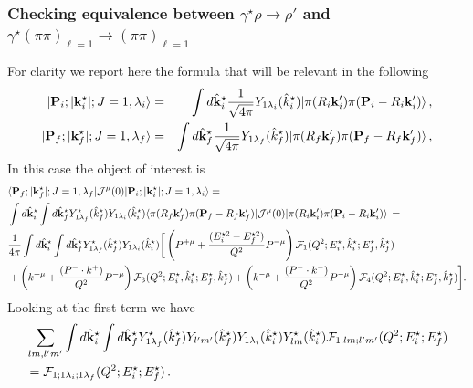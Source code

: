 {\subsubsection{Checking equivalence between $\gamma^\star\rho\to\rho'$ and $\gamma^\star(\pi\pi)_{\ell=1}\to(\pi\pi)_{\ell=1}$}
For clarity we report here the formula that will be relevant in the following
\begin{eqnarray}
|{\bf P}_i;|{\bf k}_i^\star|;J=1,\lambda_i\rangle&=&\int d\hat{\bf k}^\star_i\frac{1}{\sqrt{4\pi}}Y_{1\lambda_i}(\hat{k}_i^\star)|\pi(R_i{\bf k}_i^\prime)\pi({\bf P}_i-R_i{\bf k}_i^\prime)\rangle\, ,\\
|{\bf P}_f;|{\bf k}_f^\star|;J=1,\lambda_f\rangle&=&\int d\hat{\bf k}^\star_f\frac{1}{\sqrt{4\pi}}Y_{1\lambda_f}(\hat{k}_f^\star)|\pi(R_f{\bf k}_f^\prime)\pi({\bf P}_f-R_f{\bf k}_f^\prime)\rangle\, ,
\end{eqnarray}
In this case the object of interest is
\begin{eqnarray}
&\langle{\bf P}_f;|{\bf k}^\star_f|;J=1,\lambda_f|{\cal J}^\mu(0)|{\bf P}_i;|{\bf k}^\star_i|;J=1,\lambda_i\rangle=\\
&\int d\hat{\bf k}_i^\star\int d\hat{\bf k}_f^\star Y^\star_{1\lambda_f}(\hat{k}_f^\star) Y_{1\lambda_i}(\hat{k}_i^\star)\langle\pi(R_f{\bf k}_f^\prime)\pi({\bf P}_f-R_f{\bf k}_f^\prime)|{\cal J}^\mu(0)|\pi(R_i{\bf k}_i^\prime)\pi({\bf P}_i-R_i{\bf k}_i^\prime)\rangle\, =\\
&\frac{1}{4\pi}\int d\hat{\bf k}_i^\star\int d\hat{\bf k}_f^\star Y^\star_{1\lambda_f}(\hat{k}_f^\star) Y_{1\lambda_i}(\hat{k}_i^\star)\bigg[ \left(P^{+\mu}+\frac{(E_i^{\star 2}-E_f^{\star 2})}{Q^2} P^{-\mu}\right)\mathcal{F}_{1}(Q^2;E_i^\star,\hat{k}^\star_i;E_f^\star,\hat{k}^\star_f)
\nonumber\\
&+
\left(k^{+\mu}+\frac{(P^-\cdot k^{+})}{Q^2} P^{-\mu}\right)
\mathcal{F}_{3}(Q^2;E_i^\star,\hat{k}^\star_i;E_f^\star,\hat{k}^\star_f)
+
\left(k^{-\mu}+\frac{(P^-\cdot k^{-})}{Q^2} P^{-\mu}\right)
\mathcal{F}_{4}(Q^2;E_i^\star,\hat{k}^\star_i;E_f^\star,\hat{k}^\star_f)\bigg].\label{eq:pw_dec}
\end{eqnarray}
Looking at the first term we have
\begin{eqnarray}
&\sum_{lm,l^\prime m^\prime}\int d\hat{\bf k}_i^\star\int d\hat{\bf k}_f^\star Y^\star_{1\lambda_f}(\hat{k}_f^\star)Y_{l^\prime m^\prime}(\hat{k}_f^\star)  Y_{1\lambda_i}(\hat{k}_i^\star)Y^\star_{lm}(\hat{k}_i^\star) \mathcal{F}_{1;l m;l^\prime m^\prime}(Q^2;E_i^\star;E_f^\star)\nonumber\\
&=\mathcal{F}_{1;1 \lambda_i;1 \lambda_f}(Q^2;E_i^\star;E_f^\star)\, .\label{eq:pw_dec_1st}

\end{eqnarray}}
